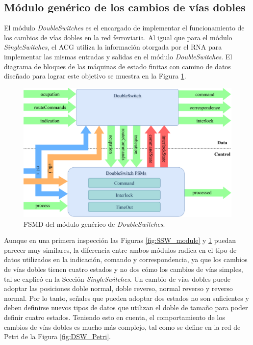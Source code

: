 \subsection{Módulo genérico de los cambios de vías dobles}
	\label{sec:ACG_dsw}
	
	El módulo \textit{DoubleSwitches} es el encargado de implementar el funcionamiento de los cambios de vías dobles en la red ferroviaria. Al igual que para el módulo \textit{SingleSwitches}, el ACG utiliza la información otorgada por el RNA para implementar las mismas entradas y salidas en el módulo \textit{DoubleSwitches}. El diagrama de bloques de las máquinas de estado finitas con camino de datos diseñado para lograr este objetivo se muestra en la Figura \ref{fig:DSW_module}.
	
	\begin{figure}[H]
		\centering
		\includegraphics[width=1\textwidth]{Figuras/DSW_module}
		\centering\caption{FSMD del módulo genérico de \textit{DoubleSwitches}.}
		\label{fig:DSW_module}
	\end{figure}
	
	Aunque en una primera inspección las Figuras \ref{fig:SSW_module} y \ref{fig:DSW_module} puedan parecer muy similares, la diferencia entre ambos módulos radica en el tipo de datos utilizados en la indicación, comando y correspondencia, ya que los cambios de vías dobles tienen cuatro estados y no dos cómo los cambios de vías simples, tal se explicó en la Sección \textit{SingleSwitches}. Un cambio de vías dobles puede adoptar las posiciones doble normal, doble reverso, normal reverso y reverso normal. Por lo tanto, señales que pueden adoptar dos estados no son suficientes y deben definirse nuevos tipos de datos que utilizan el doble de tamaño para poder definir cuatro estados. Teniendo esto en cuenta, el comportamiento de los cambios de vías dobles es mucho más complejo, tal como se define en la red de Petri de la Figura \ref{fig:DSW_Petri}.
	
